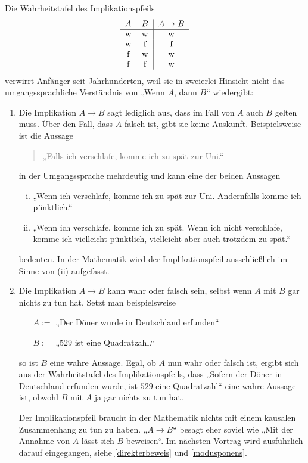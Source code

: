 \begin{bem}
    Die Wahrheitstafel des Implikationspfeils
    \[\begin{tabular}{cc|c}
        $A$ & $B$ &  $A\to B$  \\
        \hline
        w&w& w\\
        w&f& f\\
        f&w& w\\
        f&f& w\\
    \end{tabular}\]
    verwirrt Anfänger seit Jahrhunderten, weil sie in zweierlei Hinsicht nicht das umgangssprachliche Verständnis von „Wenn $A$, dann $B$“ wiedergibt:
    \begin{enumerate}[1.]
        \item Die Implikation $A\to B$ sagt lediglich aus, dass im Fall von $A$ auch $B$ gelten muss. Über den Fall, dass $A$ falsch ist, gibt sie keine Auskunft. Beispielsweise ist die Aussage
        \begin{quote}
            „Falls ich verschlafe, komme ich zu spät zur Uni.“
        \end{quote}
        in der Umgangssprache mehrdeutig und kann eine der beiden Aussagen
        \begin{enumerate}[(i)]
            \item „Wenn ich verschlafe, komme ich zu spät zur Uni. Andernfalls komme ich pünktlich.“
            \item „Wenn ich verschlafe, komme ich zu spät. Wenn ich nicht verschlafe, komme ich vielleicht pünktlich, vielleicht aber auch trotzdem zu spät.“
        \end{enumerate}
        bedeuten. In der Mathematik wird der Implikationspfeil ausschließlich im Sinne von (ii) aufgefasst.
        \item Die Implikation $A\to B$ kann wahr oder falsch sein, selbst wenn $A$ mit $B$ gar nichts zu tun hat. Setzt man beispielsweise
        \begin{itemize}[labelindent=3em, leftmargin=!, labelwidth=]
            \item[$A:=$] „Der Döner wurde in Deutschland erfunden“
            \item[$B:=$] „$529$ ist eine Quadratzahl.“
        \end{itemize}
        so ist $B$ eine wahre Aussage. Egal, ob $A$ nun wahr oder falsch ist, ergibt sich aus der Wahrheitstafel des Implikationspfeils, dass „Sofern der Döner in Deutschland erfunden wurde, ist $529$ eine Quadratzahl“ eine wahre Aussage ist, obwohl $B$ mit $A$ ja gar nichts zu tun hat.

        Der Implikationspfeil braucht in der Mathematik nichts mit einem kausalen Zusammenhang zu tun zu haben. „$A\to B$“ besagt eher soviel wie „Mit der Annahme von $A$ lässt sich $B$ beweisen“. Im nächsten Vortrag wird ausführlich darauf eingegangen, siehe \cref{direkterbeweis} und \cref{modusponens}.
    \end{enumerate}
\end{bem}





